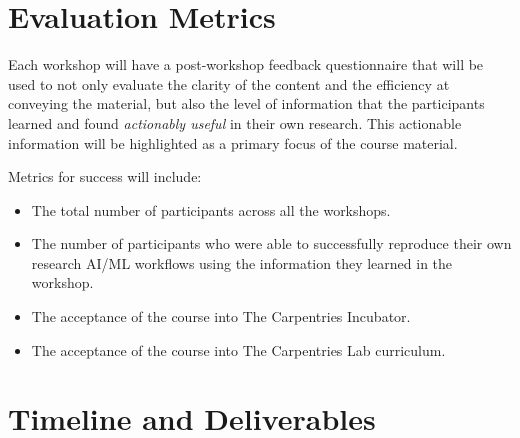 \documentclass[letterpaper, 11pt]{article}
\begin{document}
\section{Evaluation Metrics}


Each workshop will have a post-workshop feedback questionnaire that will be used to not only evaluate the clarity of the content and the efficiency at conveying the material, but also the level of information that the participants learned and found \emph{actionably useful} in their own research.
This actionable information will be highlighted as a primary focus of the course material.

Metrics for success will include:
\begin{itemize}
  \item The total number of participants across all the workshops.
  \item The number of participants who were able to successfully reproduce their own research AI/ML workflows using the information they learned in the workshop.
  \item The acceptance of the course into The Carpentries Incubator.
  \item The acceptance of the course into The Carpentries Lab curriculum.
\end{itemize}

\section{Timeline and Deliverables}


\end{document}
